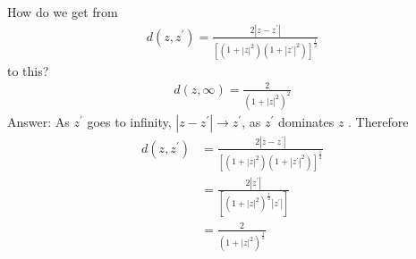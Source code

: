 \documentclass[12pt]{article}
\title{}
\author{Jerich Lee}
\date{\today}
\theoremstyle{definition} %
\theoremstyle{plain} %
\begin{document}
\maketitle
How do we get from 
\begin{align}
    d(z,z^\prime )=\frac{2\left\vert z-z^\prime  \right\vert }{\left[ (1+\left\vert z \right\vert^{2})(1+\left\vert z^\prime  \right\vert^{2}  ) \right]^{\frac{1}{2}} }
\end{align}
to this?
\begin{align}
    d(z,\infty )=\frac{2}{\left( 1+\left\vert z \right\vert ^{2} \right)^{2} }
\end{align}
Answer: As $z^\prime $ goes to infinity, $\left\vert z-z^\prime \right\vert \to z^\prime $, as $z^\prime $ dominates $z$ . Therefore
\begin{align} 
    d(z,z^\prime )&=\frac{2\left\vert z-z^\prime  \right\vert }{\left[ (1+\left\vert z \right\vert^{2})(1+\left\vert z^\prime  \right\vert^{2}  ) \right]^{\frac{1}{2}} } \\[10pt] 
    &= \frac{2\left\vert z^\prime  \right\vert  }{\left[ (1+\left\vert z \right\vert ^{2})^{\frac{1}{2}}\left\vert z^\prime  \right\vert  \right] }\\[10pt] 
    &=\frac{2}{\left( 1+\left\vert z \right\vert ^{2} \right)^{\frac{1}{2}} }
\end{align}  
\end{document}
